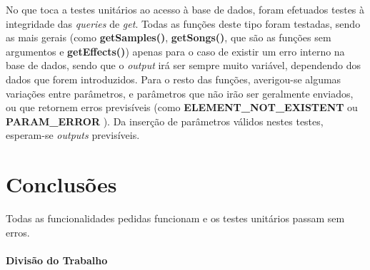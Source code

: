 \documentclass{report}
\begin{document}
No que toca a testes unitários ao acesso à base de dados, foram efetuados testes à integridade das \textit{queries} de \textit{get}. Todas as funções deste tipo foram testadas, sendo as mais gerais (como \textbf{getSamples()}, \textbf{getSongs()}, que são as funções sem argumentos e \textbf{getEffects()}) apenas para o caso de existir um erro interno na base de dados, sendo que o \textit{output} irá ser sempre muito variável, dependendo dos dados que forem introduzidos. Para o resto das funções, averigou-se algumas variações entre parâmetros, e parâmetros que não irão ser geralmente enviados, ou que retornem erros previsíveis (como \textbf{ELEMENT\_NOT\_EXISTENT} ou \textbf{PARAM\_ERROR} ). Da inserção de parâmetros válidos nestes testes, esperam-se \textit{outputs} previsíveis.

\chapter{Conclusões}
\label{chap.conclusao}

Todas as funcionalidades pedidas funcionam e os testes unitários passam sem erros.

\subsubsection{Divisão do Trabalho}
\end{document}
